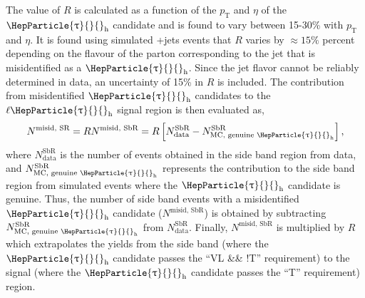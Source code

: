 \documentclass[12pt, a4paper]{article}
\newcommand{\pt}{\ensuremath{p_{\mathrm{T}}}\xspace}
\DeclareRobustCommand{\PW}{{\HepParticle{W}{}{}}\xspace}
\DeclareRobustCommand{\PGt}{{\HepParticle{\uptau}{}{}}\xspace} %
\newcommand{\tauh}{\ensuremath{\PGt_\mathrm{h}}\xspace}
\begin{document}
The value of $R$ is calculated as a function of the \pt and $\eta$ of the \tauh candidate and is found to vary between 15-30\% with \pt and $\eta$.
It is found using simulated {\PW}+jets events that $R$ varies by ${\approx}15\%$ percent depending on the flavour of the parton corresponding to the jet that is misidentified as a \tauh. Since the jet flavor cannot be reliably determined in data, an uncertainty of 15\% in $R$ is included.
The contribution from misidentified \tauh candidates to the $\ell\tauh$ signal region is then evaluated as,
	\begin{equation}
	N^{\text{misid, SR}} = R N^{\text{misid, SbR}} = R \left[N_{\text{data}}^{\text{SbR}} - N_{\text{MC, genuine \tauh}}^{\text{SbR}}\right],
	\end{equation}
where $N_{\text{data}}^{\text{SbR}}$ is the number of events obtained in the side band region from data, and $N_{\text{MC, genuine \tauh}}^{\text{SbR}}$ represents the contribution to the side band region from simulated events where the $\tauh$ candidate is genuine.
Thus, the number of side band events with a misidentified \tauh candidate ($N^{\text{misid, SbR}}$) is obtained by subtracting $N_{\text{MC, genuine \tauh}}^{\text{SbR}}$ from $N_{\text{data}}^{\text{SbR}}$.
Finally, $N^{\text{misid, SbR}}$ is multiplied by $R$ which extrapolates the yields from the side band (where the \tauh candidate passes the ``VL \&\& !T'' requirement) to the signal (where the \tauh candidate passes the ``T'' requirement) region.
\end{document}
